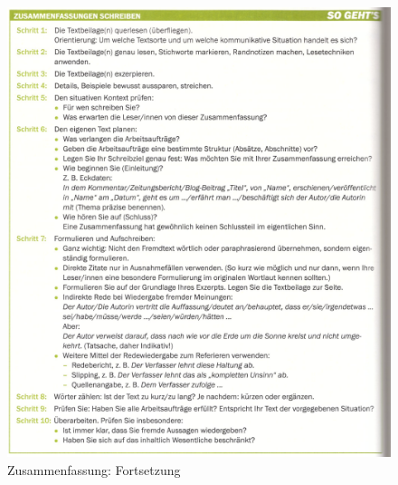\begin{figure}[h]
    \centering
    \includegraphics[scale=0.8]{./pics/Screenshot from 2023-02-06 12-33-47.png}
    \caption{Zusammenfassung: Fortsetzung}
    \label{fig:impl:Zusammenfassung3}
\end{figure}
